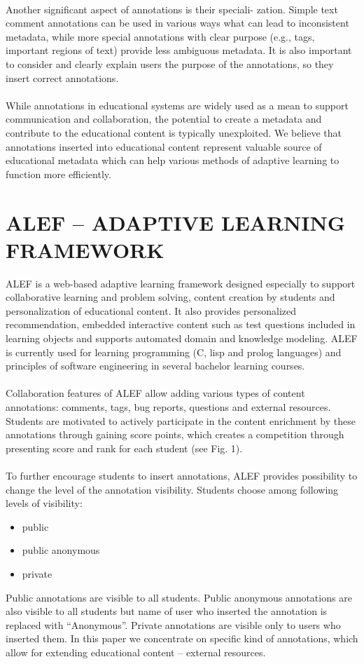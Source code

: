 \documentclass{llncs}
\begin{document}
\\
Another significant aspect of annotations is their speciali- zation. Simple text comment annotations can be used in various ways what can lead to inconsistent metadata, while more special annotations with clear purpose (e.g., tags, important regions of text) provide less ambiguous metadata. It is also important to consider and clearly explain users the purpose of the annotations, so they insert correct annotations.\\
\\
While annotations in educational systems are widely used as a mean to support communication and collaboration, the 
potential to create a metadata and contribute to the educational content is typically unexploited. We believe that annotations inserted into educational content represent valuable source of educational metadata which can help various methods of adaptive learning to function more efficiently.
\section{ALEF – ADAPTIVE LEARNING FRAMEWORK }
% 
ALEF is a web-based adaptive learning framework designed especially to support collaborative learning and problem solving, content creation by students and personalization of educational content. It also provides personalized recommendation, embedded interactive content such as test questions included in learning objects and supports automated domain and knowledge modeling. ALEF is currently used for learning programming (C, lisp and prolog languages) and principles of software engineering in several bachelor learning courses.\\
\\
Collaboration features of ALEF allow adding various types of content annotations: comments, tags, bug reports, questions and external resources. Students are motivated to actively participate in the content enrichment by these annotations through gaining score points, which creates a competition through presenting score and rank for each student (see Fig. 1).\\
\\
To further encourage students to insert annotations, ALEF provides possibility to change the level of the annotation visibility. Students choose among following levels of visibility:
\begin{itemize}
\item public 
\item public anonymous 
\item private 
\end{itemize}
Public annotations are visible to all students. Public anonymous annotations are also visible to all students but name of user who inserted the annotation is replaced with “Anonymous”. Private annotations are visible only to users who inserted them. In this paper we concentrate on specific kind of annotations, which allow for extending educational content – external resources.  
\end{document}
